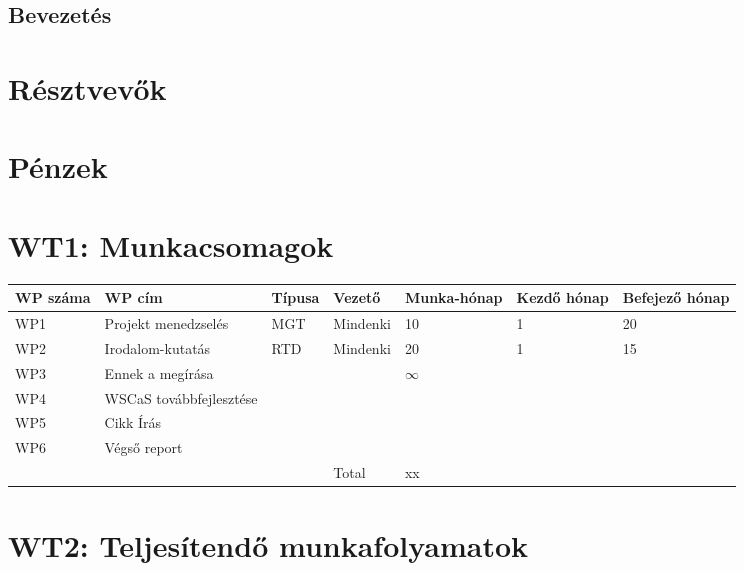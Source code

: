 \normalsize


\newpage
\subsection{Bevezetés}
\blindtext
\blindtext\blindtext\blindtext\blindtext\blindtext

\newpage
\section{Résztvevők}

\newpage
\section{Pénzek}

\newpage
\section*{WT1: Munkacsomagok}
\Large
\begin{tabular}{|p{}|p{}|p{}|p{}|p{}|p{}|p{}|}
\hline
\textbf{WP száma}  & \textbf{WP cím} & \textbf{Típusa} & \textbf{Vezető} & \textbf{Munka-hónap} & \textbf{Kezdő hónap} & \textbf{Befejező hónap} \\[3ex]
\hline
WP1 & Projekt menedzselés & MGT & Mindenki & 10 & 1 & 20 \\ [3ex]
\hline
WP2 & Irodalom-kutatás & RTD & Mindenki & 20 & 1 & 15 \\ [3ex]
\hline
WP3 & Ennek a megírása & & & $\infty$ & & \\ [3ex]
\hline
WP4 & WSCaS továbbfejlesztése & & & & & \\ [3ex]
\hline
WP5 & Cikk Írás & & & & & \\ [3ex]
\hline
WP6 & Végső report & & & & & \\ [3ex]
\hline
\multicolumn{3}{c|}{}& Total & xx & \multicolumn{2}{|c}{} \\ [3ex]
\cline{4-5}
\end{tabular}

\newpage
\section*{WT2: Teljesítendő munkafolyamatok}

